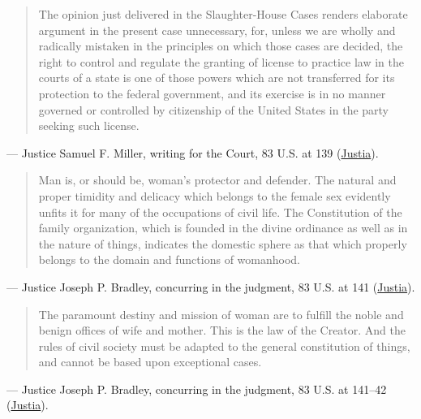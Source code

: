 \documentclass[12pt]{article}
\begin{document}
\begin{quote}
The opinion just delivered in the Slaughter-House Cases renders elaborate argument in the present case unnecessary, for, unless we are wholly and radically mistaken in the principles on which those cases are decided, the right to control and regulate the granting of license to practice law in the courts of a state is one of those powers which are not transferred for its protection to the federal government, and its exercise is in no manner governed or controlled by citizenship of the United States in the party seeking such license.
\end{quote}
\noindent --- Justice Samuel F. Miller, writing for the Court, 83 U.S. at 139 (\href{https://supreme.justia.com/cases/federal/us/83/130/}{Justia}).

\begin{quote}
Man is, or should be, woman's protector and defender. The natural and proper timidity and delicacy which belongs to the female sex evidently unfits it for many of the occupations of civil life. The Constitution of the family organization, which is founded in the divine ordinance as well as in the nature of things, indicates the domestic sphere as that which properly belongs to the domain and functions of womanhood.
\end{quote}
\noindent --- Justice Joseph P. Bradley, concurring in the judgment, 83 U.S. at 141 (\href{https://supreme.justia.com/cases/federal/us/83/130/}{Justia}).

\begin{quote}
The paramount destiny and mission of woman are to fulfill the noble and benign offices of wife and mother. This is the law of the Creator. And the rules of civil society must be adapted to the general constitution of things, and cannot be based upon exceptional cases.
\end{quote}
\noindent --- Justice Joseph P. Bradley, concurring in the judgment, 83 U.S. at 141--42 (\href{https://supreme.justia.com/cases/federal/us/83/130/}{Justia}).
\end{document}
